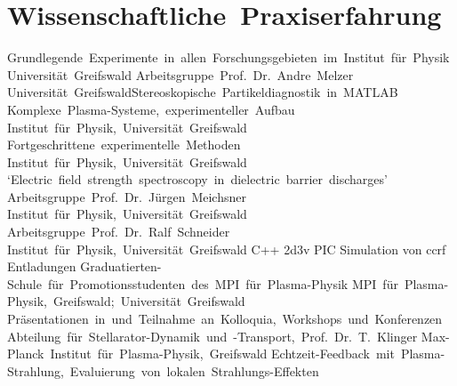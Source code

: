 \documentclass[11pt,a4paper]{moderncv}
\begin{document}
    \section{Wissenschaftliche~Praxiserfahrung}
        {Grundlegende~Experimente~in~allen~Forschungsgebieten~im~Institut~für~Physik\newline}{}%
        {Universität~Greifswald}{}
        {Arbeitsgruppe~Prof.~Dr.~Andre~Melzer\newline}{}%
        {Universität~Greifswald\newline}{Stereoskopische~Partikeldiagnostik~in~MATLAB}
        {Komplexe~Plasma-Systeme,~experimenteller~Aufbau\newline}{}%
        {Institut~für~Physik,~Universität~Greifswald}{}
        {Fortgeschrittene~experimentelle~Methoden\newline}{}%
        {Institut~für~Physik,~Universität~Greifswald}{}
        {`Electric~field~strength~spectroscopy~in~dielectric~barrier~discharges'\newline}{}%
        {Arbeitsgruppe~Prof.~Dr.~Jürgen~Meichsner\newline}%
        {Institut~für~Physik,~Universität~Greifswald}
        {Arbeitsgruppe~Prof.~Dr.~Ralf~Schneider\newline}{}%
        {Institut~für~Physik,~Universität~Greifswald\newline}%
        {C++ 2d3v PIC Simulation von ccrf Entladungen}
        {Graduatierten-Schule~für~Promotionsstudenten~des~MPI~für~Plasma-Physik\newline}{}%
        {MPI~für~Plasma-Physik,~Greifswald;~Universität~Greifswald\newline}%
        {Präsentationen~in~und~Teilnahme~an~Kolloquia,~Workshops~und~Konferenzen}
        {Abteilung~für~Stellarator-Dynamik~und~-Transport,~Prof.~Dr.~T.~Klinger\newline}{}%
        {Max-Planck~Institut~für~Plasma-Physik,~Greifswald\newline}%
        {Echtzeit-Feedback~mit~Plasma-Strahlung,~Evaluierung~von~lokalen~Strahlungs-Effekten}
\end{document}
